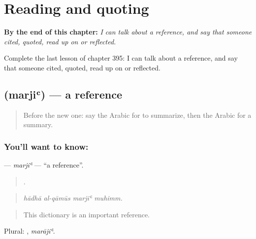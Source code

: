 
\chapter{Reading and quoting}
\label{ch:ar-reading-and-quoting}

\begin{chapteropening}
\textbf{By the end of this chapter:} \emph{I can talk about a reference, and say that someone cited, quoted, read up on or reflected.}

Complete the last lesson of chapter 395: I can talk about a reference, and say that someone cited, quoted, read up on or reflected.
\end{chapteropening}

\section[\texorpdfstring{\ar{مرجع} (marjiʿ)}{مرجع (marjiʿ)}]{ (marjiʿ) — a reference}

\label{lesson:AR-C395-marji}



\begin{quote}
Before the new one: say the Arabic for to summarize, then the Arabic for a summary.
\end{quote}

\subsection*{You'll want to know: }
\textbf{} — \emph{marjiʿ} — \textquotedblleft{}a reference\textquotedblright{}.

\begin{quote}
   .
\end{quote}

\begin{quote}
\emph{hādhā al-qāmūs marjiʿ muhimm.}
\end{quote}

\begin{quote}
This dictionary is an important reference.
\end{quote}

Plural: , \emph{marājiʿ}.

